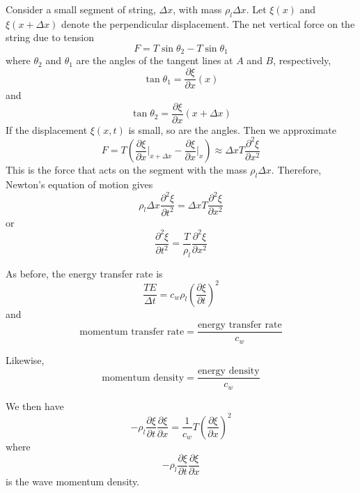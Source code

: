 \documentclass[12pt, a4paper, oneside, openright, titlepage]{book}
\begin{document}
Consider a small segment of string, $\Delta x$, with mass $\rho_l\Delta x$. Let $\xi(x)$ and $\xi(x+\Delta x)$ denote the perpendicular displacement. The net vertical force on the string due to tension
\begin{equation*}
    F = T\sin\theta_2 - T\sin\theta_1
\end{equation*}
where $\theta_2$ and $\theta_1$ are the angles of the tangent lines at $A$ and $B$, respectively,
\begin{equation*}
    \tan\theta_1 = \frac{\partial\xi}{\partial x}(x)
\end{equation*}
and
\begin{equation*}
    \tan\theta_2 = \frac{\partial\xi}{\partial x}(x+\Delta x)
\end{equation*}
If the displacement $\xi(x,t)$ is small, so are the angles. Then we approximate
\begin{equation*}
    F = T\left(\frac{\partial\xi}{\partial x}\Bigg\vert_{x+\Delta x}-\frac{\partial\xi}{\partial x}\Bigg\vert_x\right) \approx \Delta x T\frac{\partial^2\xi}{\partial x^2}
\end{equation*}
This is the force that acts on the segment with the mass $\rho_l\Delta x$. Therefore, Newton's equation of motion gives
\begin{equation*}
    \rho_l\Delta x\frac{\partial^2\xi}{\partial t^2} = \Delta x T\frac{\partial^2\xi}{\partial x^2}
\end{equation*}
or
\begin{equation*}
    \frac{\partial^2\xi}{\partial t^2} = \frac{T}{\rho_l}\frac{\partial^2\xi}{\partial x^2}
\end{equation*}


As before, the energy transfer rate is
\begin{equation*}
    \frac{TE}{\Delta t} = c_w\rho_l\left(\frac{\partial\xi}{\partial t}\right)^2
\end{equation*}
and
\begin{equation*}
    \text{momentum transfer rate} = \frac{\text{energy transfer rate}}{c_w}
\end{equation*}

Likewise,
\begin{equation*}
    \text{momentum density} = \frac{\text{energy density}}{c_w}
\end{equation*}


We then have
\begin{equation*}
    -\rho_l \frac{\partial\xi}{\partial t}\frac{\partial\xi}{\partial x} = \frac{1}{c_w}T \left(\frac{\partial \xi}{\partial x}\right)^2
\end{equation*}
where 
\begin{equation*}
    -\rho_l\frac{\partial\xi}{\partial t}\frac{\partial \xi}{\partial x}
\end{equation*}
is the wave momentum density.
\end{document}
